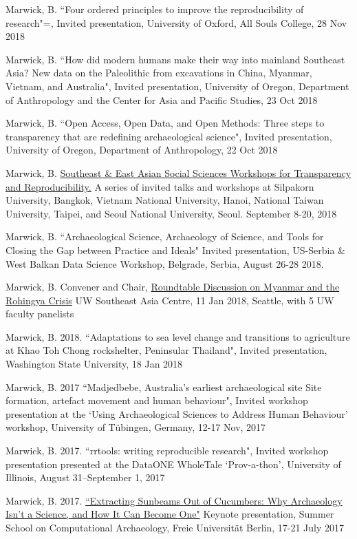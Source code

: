 \ind Marwick, B. ``Four ordered principles to improve the reproducibility of research"=, Invited presentation, University of Oxford, All Souls College, 28 Nov 2018

\ind Marwick, B. ``How did modern humans make their way into mainland Southeast Asia? New data on the Paleolithic from excavations in China, Myanmar, Vietnam, and Australia", Invited presentation, University of Oregon, Department of Anthropology and the Center for Asia and Pacific Studies, 23 Oct 2018

\ind Marwick, B. ``Open Access, Open Data, and Open Methods: Three steps to transparency that are redefining archaeological science", Invited presentation, University of Oregon, Department of Anthropology, 22 Oct 2018

\ind Marwick, B. \href{https://osf.io/ybj43/}{Southeast \& East Asian Social Sciences Workshops for Transparency and Reproducibility.} A series of invited talks and workshops at Silpakorn University, Bangkok, Vietnam National University, Hanoi, National Taiwan University, Taipei, and Seoul National University, Seoul. September 8-20, 2018

\ind Marwick, B. ``Archaeological Science, Archaeology of Science, and Tools for Closing the Gap between Practice and Ideals" Invited presentation, US-Serbia \& West Balkan Data Science Workshop, Belgrade, Serbia, August 26-28 2018.

\ind Marwick, B. Convener and Chair, \href{https://jsis.washington.edu/seac/news/roundtable-discussion-myanmar-rohingya-crisis-2/}{Roundtable Discussion on Myanmar and the Rohingya Crisis} UW Southeast Asia Centre, 11 Jan 2018, Seattle, with 5 UW faculty panelists

\ind Marwick, B. 2018. ``Adaptations to sea level change and transitions to agriculture at Khao Toh Chong rockshelter, Peninsular Thailand", Invited presentation, Washington State University, 18 Jan 2018

\ind Marwick, B. 2017 ``Madjedbebe, Australia's earliest archaeological site Site formation, artefact movement and human behaviour", Invited workshop presentation at the ‘Using Archaeological Sciences to Address Human Behaviour’ workshop, University of Tübingen, Germany, 12-17 Nov, 2017

\ind Marwick, B. 2017. ``rrtools: writing reproducible research", Invited workshop presentation presented at the DataONE WholeTale ‘Prov-a-thon’, University of Illinois, August 31–September 1, 2017

\ind Marwick, B. 2017. \href{https://github.com/benmarwick/berlinsummerschoolkeynote}{``Extracting Sunbeams Out of Cucumbers: Why Archaeology Isn't a Science, and How It Can Become One"} Keynote presentation, Summer School on Computational Archaeology, Freie Universität Berlin, 17-21 July 2017


